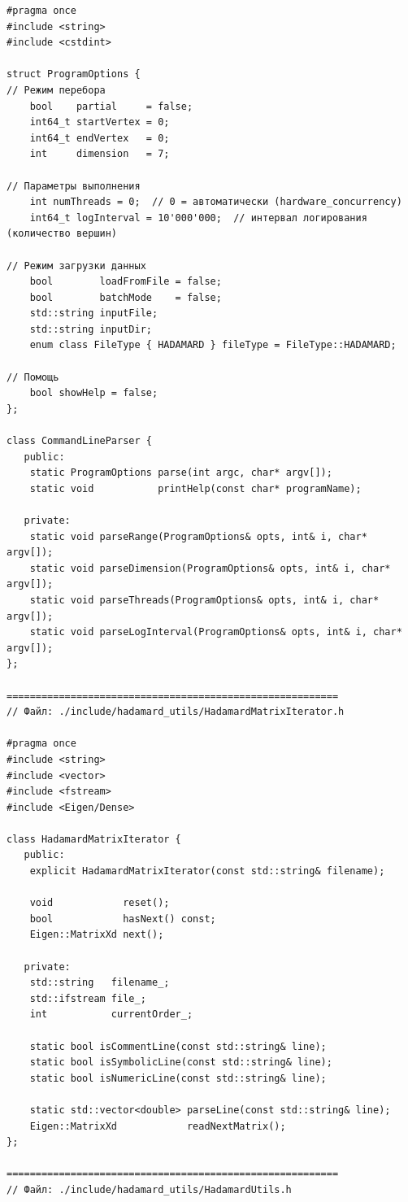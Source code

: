\documentclass[a4paper,12pt]{article}
\begin{document}
\begin{lstlisting}
#pragma once
#include <string>
#include <cstdint>

struct ProgramOptions {
// Режим перебора
    bool    partial     = false;
    int64_t startVertex = 0;
    int64_t endVertex   = 0;
    int     dimension   = 7;

// Параметры выполнения
    int numThreads = 0;  // 0 = автоматически (hardware_concurrency)
    int64_t logInterval = 10'000'000;  // интервал логирования (количество вершин)

// Режим загрузки данных
    bool        loadFromFile = false;
    bool        batchMode    = false;
    std::string inputFile;
    std::string inputDir;
    enum class FileType { HADAMARD } fileType = FileType::HADAMARD;

// Помощь
    bool showHelp = false;
};

class CommandLineParser {
   public:
    static ProgramOptions parse(int argc, char* argv[]);
    static void           printHelp(const char* programName);

   private:
    static void parseRange(ProgramOptions& opts, int& i, char* argv[]);
    static void parseDimension(ProgramOptions& opts, int& i, char* argv[]);
    static void parseThreads(ProgramOptions& opts, int& i, char* argv[]);
    static void parseLogInterval(ProgramOptions& opts, int& i, char* argv[]);
};

=========================================================
// Файл: ./include/hadamard_utils/HadamardMatrixIterator.h

#pragma once
#include <string>
#include <vector>
#include <fstream>
#include <Eigen/Dense>

class HadamardMatrixIterator {
   public:
    explicit HadamardMatrixIterator(const std::string& filename);

    void            reset();
    bool            hasNext() const;
    Eigen::MatrixXd next();

   private:
    std::string   filename_;
    std::ifstream file_;
    int           currentOrder_;

    static bool isCommentLine(const std::string& line);
    static bool isSymbolicLine(const std::string& line);
    static bool isNumericLine(const std::string& line);

    static std::vector<double> parseLine(const std::string& line);
    Eigen::MatrixXd            readNextMatrix();
};

=========================================================
// Файл: ./include/hadamard_utils/HadamardUtils.h


\end{lstlisting}
\end{document}
